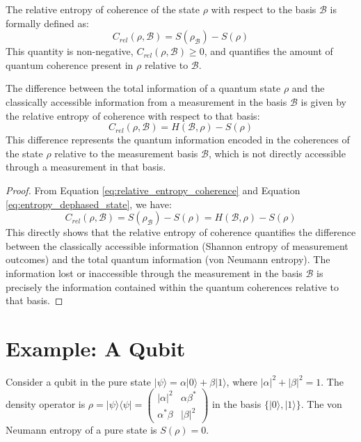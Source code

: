 	The relative entropy of coherence of the state $\rho$ with respect to the basis $\mathcal{B}$ is formally defined as:
	\begin{equation}
		C_{rel}(\rho, \mathcal{B}) = S(\rho_{\mathcal{B}}) - S(\rho)
		\label{eq:relative_entropy_coherence}
	\end{equation}
	This quantity is non-negative, $C_{rel}(\rho, \mathcal{B}) \ge 0$, and quantifies the amount of quantum coherence present in $\rho$ relative to $\mathcal{B}$.
	
	\begin{proposition}
		The difference between the total information of a quantum state $\rho$ and the classically accessible information from a measurement in the basis $\mathcal{B}$ is given by the relative entropy of coherence with respect to that basis:
		$$C_{rel}(\rho, \mathcal{B}) = H(\mathcal{B}, \rho) - S(\rho)$$
		This difference represents the quantum information encoded in the coherences of the state $\rho$ relative to the measurement basis $\mathcal{B}$, which is not directly accessible through a measurement in that basis.
	\end{proposition}
	\begin{proof}
		From Equation \eqref{eq:relative_entropy_coherence} and Equation \eqref{eq:entropy_dephased_state}, we have:
		$$C_{rel}(\rho, \mathcal{B}) = S(\rho_{\mathcal{B}}) - S(\rho) = H(\mathcal{B}, \rho) - S(\rho)$$
		This directly shows that the relative entropy of coherence quantifies the difference between the classically accessible information (Shannon entropy of measurement outcomes) and the total quantum information (von Neumann entropy). The information lost or inaccessible through the measurement in the basis $\mathcal{B}$ is precisely the information contained within the quantum coherences relative to that basis.
	\end{proof}
	
	\section{Example: A Qubit}
	
	Consider a qubit in the pure state $|\psi\rangle = \alpha |0\rangle + \beta |1\rangle$, where $|\alpha|^2 + |\beta|^2 = 1$. The density operator is $\rho = |\psi\rangle\langle\psi| = \begin{pmatrix} |\alpha|^2 & \alpha \beta^* \\ \alpha^* \beta & |\beta|^2 \end{pmatrix}$ in the basis $\{|0\rangle, |1\rangle\}$. The von Neumann entropy of a pure state is $S(\rho) = 0$.
	
